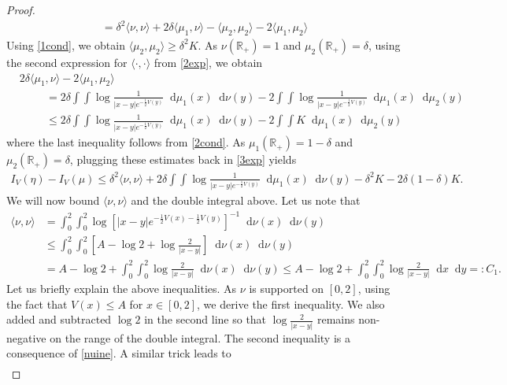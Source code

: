 \documentclass[reqno,11pt]{amsart}
\numberwithin{equation}{section}
\theoremstyle{definition}
\newcommand{\R}{\mathbb{R}}
\newcommand*\diff{\mathop{}\!\mathrm{d}}
\begin{document}
\begin{proof}
\begin{align}
    =\delta^2\langle \nu,\nu\rangle+2\delta\langle \mu_1 ,\nu\rangle -  \langle \mu_2 ,\mu_2\rangle-2\langle \mu_1 ,\mu_2\rangle \label{3exp}
\end{align}
Using \eqref{1cond}, we obtain $\langle \mu_2 ,\mu_2\rangle \ge \delta^2 K$. 
As $\nu(\mathbb{R}_+)=1$ and $\mu_2(\mathbb{R}_+)=\delta$, using the second expression for $\langle \cdot,\cdot \rangle$ from \eqref{2exp}, we obtain
\begin{align*}
    & 2\delta\langle \mu_1 ,\nu\rangle -2\langle \mu_1 ,\mu_2\rangle \\ & \hspace{1cm}= 2\delta \int\int \log \frac{1}{|x-y|e^{-\frac12V(y)}}\diff \mu_1(x)\diff\nu(y) - 2\int\int \log \frac{1}{|x-y|e^{-\frac12V(y)}}\diff \mu_1(x)\diff\mu_2(y) \\ & \hspace{1cm} \le 2\delta \int\int \log \frac{1}{|x-y|e^{-\frac12V(y)}}\diff \mu_1(x)\diff\nu(y) - 2\int\int K\diff \mu_1(x)\diff\mu_2(y)
\end{align*}
where the last inequality follows from \eqref{2cond}. As $\mu_1(\R_+)=1-\delta$ and $\mu_2(\R_+)=\delta$, plugging these estimates back in \eqref{3exp} yields
\begin{align}\label{4exp}
    I_V(\eta)-I_V(\mu)  \le \delta^2\langle \nu,\nu\rangle+2\delta\int\int \log \frac{1}{|x-y|e^{-\frac12V(y)}}\diff \mu_1(x)\diff\nu(y)-\delta^2K-2\delta(1-\delta)K.
\end{align}
We will now bound $\langle \nu,\nu\rangle$ and the double integral above. Let us note that
\begin{align*}
\langle \nu,\nu\rangle & = \int_0^2\int_0^2 \log \left[|x-y|e^{-\frac12V(x)-\frac12V(y)}\right]^{-1}\diff \nu(x) \diff \nu(y) \\ & \le \int_0^2\int_0^2 \left[A-\log 2+\log\frac2{|x-y|}\right]\diff \nu(x) \diff \nu(y) \\ & =A-\log 2+ \int_0^2\int_0^2 \log\frac2{|x-y|}\diff \nu(x) \diff \nu(y)  \le  A-\log 2+\int_0^2\int_0^2 \log\frac{2}{|x-y|}\diff x \diff y =: C_1.
\end{align*}
Let us briefly explain the above inequalities. As $\nu$ is supported on $[0,2]$, using the fact that $V(x)\le A$ for $x\in [0,2]$, we derive the first inequality. We also added and subtracted $\log 2$ in the second line so that $\log \frac2{|x-y|}$ remains non-negative on the range of the double integral. The second inequality is a consequence of \eqref{nuine}. A similar trick leads to
\begin{align*}

\end{align*}
\end{proof}
\end{document}
